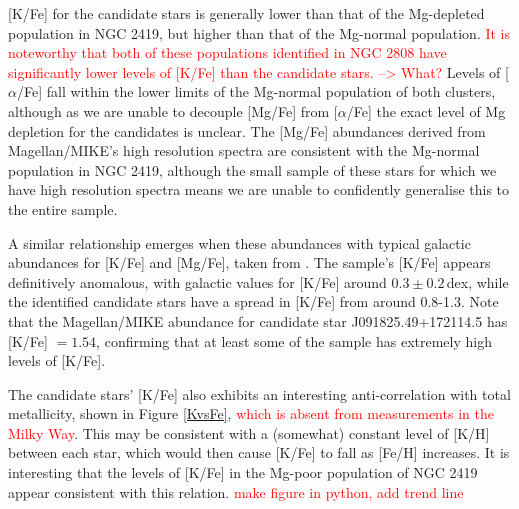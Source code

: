 \documentclass[a4paper,fleqn,usenatbib]{mnras}
\newcommand{\todo}[1]{\textcolor{red}{#1}}
\newcommand{\project}[1]{\emph{#1}}
\newcommand{\lamost}{\project{LAMOST}}
\begin{document}

[K/Fe] for the candidate stars is generally lower than that of the Mg-depleted population in NGC 2419, but higher than that of the Mg-normal population. \todo{It is noteworthy that both of these populations identified in NGC 2808 have significantly lower levels of [K/Fe] than the candidate stars. --> What?}
Levels of [$\alpha$/Fe] fall within the lower limits of the Mg-normal population of both clusters, although as we are unable to decouple [Mg/Fe] from $[\alpha$/Fe] the exact level of Mg depletion for the candidates is unclear. The [Mg/Fe] abundances derived from Magellan/MIKE's high resolution spectra are consistent with the Mg-normal population in NGC 2419, although the small sample of these stars for which we have high resolution spectra means we are unable to confidently generalise this to the entire sample.

A similar relationship emerges when these abundances with typical galactic abundances for [K/Fe] and [Mg/Fe], taken from \cite{kobayashi2011}.
The sample's [K/Fe] appears definitively anomalous, with galactic values for [K/Fe] around $0.3 \pm 0.2$\,dex, while the identified candidate stars have a spread in [K/Fe] from around 0.8-1.3. Note that the Magellan/MIKE abundance for candidate star J091825.49+172114.5 has [K/Fe] $=1.54$, confirming that at least some of the sample has extremely high levels of [K/Fe].

The candidate stars' [K/Fe] also exhibits an interesting anti-correlation with total metallicity, shown in Figure \ref{KvsFe}, \todo{which is absent from measurements in the Milky Way}. This may be consistent with a (somewhat) constant level of [K/H] between each star, which would then cause [K/Fe] to fall as [Fe/H] increases. It is interesting that the levels of [K/Fe] in the Mg-poor population of NGC 2419 appear consistent with this relation. \todo{make figure in python, add trend line}

\end{document}
